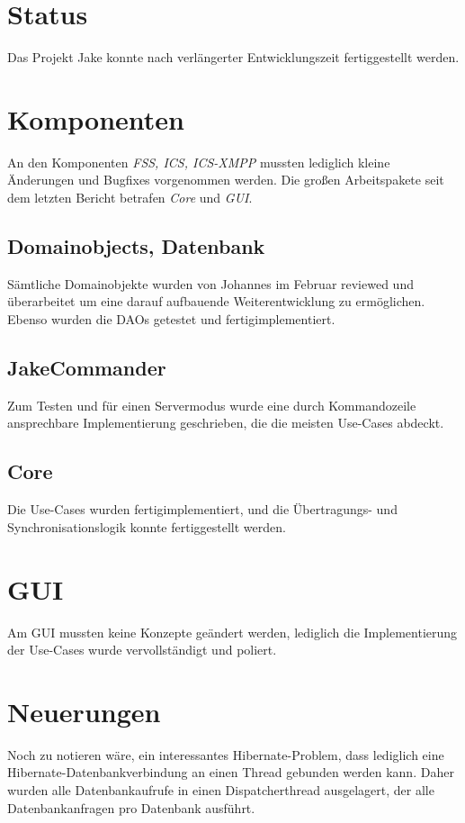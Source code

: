 \setcounter{chapter}{1}
\section{Status}
Das Projekt Jake konnte nach verlängerter Entwicklungszeit fertiggestellt werden.

\section{Komponenten}
An den Komponenten \emph{FSS, ICS, ICS-XMPP} mussten lediglich kleine Änderungen und Bugfixes vorgenommen werden. 
Die großen Arbeitspakete seit dem letzten Bericht betrafen \emph{Core} und \emph{GUI}.

\subsection{Domainobjects, Datenbank}
Sämtliche Domainobjekte wurden von Johannes im Februar reviewed und überarbeitet um eine darauf aufbauende Weiterentwicklung zu ermöglichen. Ebenso wurden die DAOs getestet und fertigimplementiert. 

\subsection{JakeCommander}
Zum Testen und für einen Servermodus wurde eine durch Kommandozeile ansprechbare Implementierung geschrieben, die die meisten Use-Cases abdeckt.


\subsection{Core}
Die Use-Cases wurden fertigimplementiert, und die Übertragungs- und Synchronisationslogik konnte fertiggestellt werden.


\section{GUI}
Am GUI mussten keine Konzepte geändert werden, lediglich die Implementierung der Use-Cases wurde vervollständigt und poliert.


\section{Neuerungen}
Noch zu notieren wäre, ein interessantes Hibernate-Problem, dass lediglich eine Hibernate-Datenbankverbindung an einen Thread gebunden werden kann. Daher wurden alle Datenbankaufrufe in einen Dispatcherthread ausgelagert, der alle Datenbankanfragen pro Datenbank ausführt.

